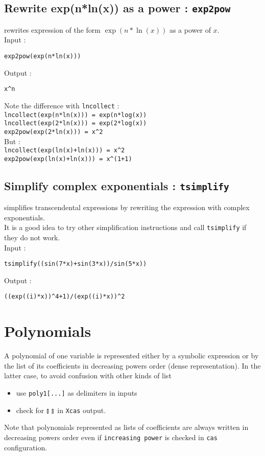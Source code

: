 \documentclass[a4paper,11pt]{book}
\begin{document}
\subsection{Rewrite exp(n*ln(x)) as a power : {\tt exp2pow}}
 rewrites expression of the form $\exp(n*\ln(x))$
as a power of $x$.\\
Input :
\begin{center}{\tt  exp2pow(exp(n*ln(x)))}\end{center}
Output :
\begin{center}{\tt x\verb|^|n}\end{center}
Note the difference with {\tt lncollect} :\\
{\tt lncollect(exp(n*ln(x))) = exp(n*log(x))}\\
{\tt lncollect(exp(2*ln(x))) = exp(2*log(x))}\\
{\tt exp2pow(exp(2*ln(x))) = x\verb|^|2 }\\
But :\\
{\tt lncollect(exp(ln(x)+ln(x))) = x\verb|^|2}\\
{\tt exp2pow(exp(ln(x)+ln(x))) = x\verb|^|(1+1)}\\

\subsection{Simplify complex exponentials : {\tt tsimplify}}
 simplifies transcendental expressions 
by rewriting the expression with complex exponentials.\\
It is a good idea to try other simplification instructions
and call {\tt tsimplify} if they do not work.\\ 
Input :
\begin{center}{\tt tsimplify((sin(7*x)+sin(3*x))/sin(5*x))}\end{center}
Output :
\begin{center}{\tt ((exp((i)*x))\verb|^|4+1)/(exp((i)*x))\verb|^|2 }\end{center}

\section{Polynomials}
A polynomial of one variable is represented either 
by a symbolic expression or by the list of its 
coefficients in decreasing powers order (dense representation).
In the latter case, to avoid confusion with other kinds of list
\begin{itemize}
\item use \verb|poly1[...]| as delimiters in inputs
\item check for $\talloblong \ \talloblong$ in {\tt Xcas} output.
\end{itemize}
Note that polynomials represented as lists of coefficients
are always written in decreasing powers order even if  
{\tt increasing power} is checked in  {\tt cas} configuration.
\end{document}
